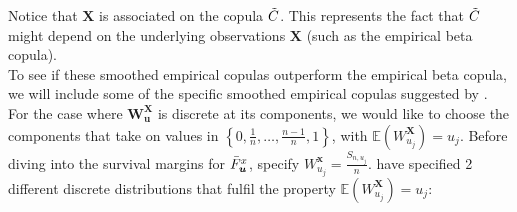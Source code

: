 \documentclass[12pt]{report}
\newcommand{\1}{\mathbf{1}}
\begin{document}
Notice that $\boldsymbol{X}$ is associated on the copula $\Tilde{C}$. This represents the fact that $\Tilde{C}$ might depend on the underlying observations $\boldsymbol{X}$ (such as the empirical beta copula). \\
\vspace{0.5cm}
To see if these smoothed empirical copulas outperform the empirical beta copula, we will include some of the specific smoothed empirical copulas suggested by \cite{KojadinovicYi2024Smooth}. For the case where $\boldsymbol{W^{X}_{u}}$ is discrete at its components, we would like to choose the components that take on values in $\left\{0, \frac{1}{n}, \dots, \frac{n-1}{n}, 1 \right\}$, with $\mathbb{E}(W^{\boldsymbol{X}}_{u_{j}}) = u_{j}$. Before diving into the survival margins for $\Bar{F}^{x}_{\boldsymbol{u}}$, specify $W_{u_{j}}^{\boldsymbol{x}} = \frac{S_{n,u_{j}}}{n}$. \cite{KojadinovicYi2024Smooth} have specified 2 different discrete distributions that fulfil the property $\mathbb{E}(W^{\boldsymbol{X}}_{u_{j}}) = u_{j}$:
\end{document}
